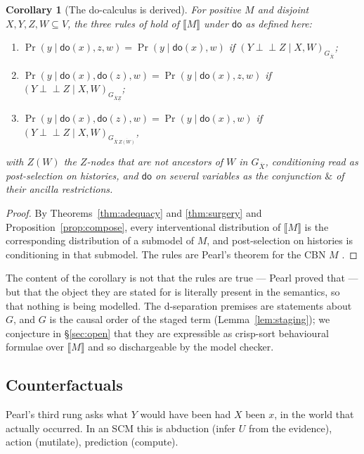 \documentclass[11pt,a4paper]{article}
\theoremstyle{plain}
\newtheorem{corollary}[theorem]{Corollary}
\theoremstyle{definition}
\theoremstyle{remark}
\newcommand{\sem}[1]{\llbracket #1 \rrbracket}
\newcommand{\dok}{\textsf{do}}
\newcommand{\dsep}{\perp\!\!\!\perp}
\begin{document}
\begin{corollary}[The do-calculus is derived]\label{cor:rules}
For positive $M$ and disjoint $X, Y, Z, W \subseteq V$, the three rules of
\cite{Pearl95} hold of $\sem{M}$ under $\dok$ as defined here:
\begin{enumerate}[leftmargin=1.6em,itemsep=1pt]
\item $\Pr(y \mid \dok(x), z, w) = \Pr(y \mid \dok(x), w)$ if
      $(Y \dsep Z \mid X, W)_{G_{\overline{X}}}$;
\item $\Pr(y \mid \dok(x), \dok(z), w) = \Pr(y \mid \dok(x), z, w)$ if
      $(Y \dsep Z \mid X, W)_{G_{\overline{X}\underline{Z}}}$;
\item $\Pr(y \mid \dok(x), \dok(z), w) = \Pr(y \mid \dok(x), w)$ if
      $(Y \dsep Z \mid X, W)_{G_{\overline{X}\,\overline{Z(W)}}}$,
\end{enumerate}
with $Z(W)$ the $Z$-nodes that are not ancestors of $W$ in $G_{\overline{X}}$,
conditioning read as post-selection on histories, and $\dok$ on several
variables as the conjunction $\&$ of their ancilla restrictions.
\end{corollary}

\begin{proof}
By Theorems~\ref{thm:adequacy} and \ref{thm:surgery} and
Proposition~\ref{prop:compose}, every interventional distribution of $\sem{M}$
is the corresponding distribution of a submodel of $M$, and post-selection on
histories is conditioning in that submodel. The rules are Pearl's theorem for
the CBN $M$ \cite{Pearl95,Pearl09}.
\end{proof}

The content of the corollary is not that the rules are true --- Pearl proved
that --- but that the object they are stated for is literally present in the
semantics, so that nothing is being modelled. The d-separation premises are
statements about $G$, and $G$ is the causal order of the staged term
(Lemma~\ref{lem:staging}); we conjecture in \S\ref{sec:open} that they are
expressible as crisp-sort behavioural formulae over $\sem{M}$ and so dischargeable
by the model checker.

\subsection{Counterfactuals}\label{ssec:cf}

Pearl's third rung asks what $Y$ would have been had $X$ been $x$, in the
world that actually occurred. In an SCM this is abduction (infer $U$ from the
evidence), action (mutilate), prediction (compute).
\end{document}
